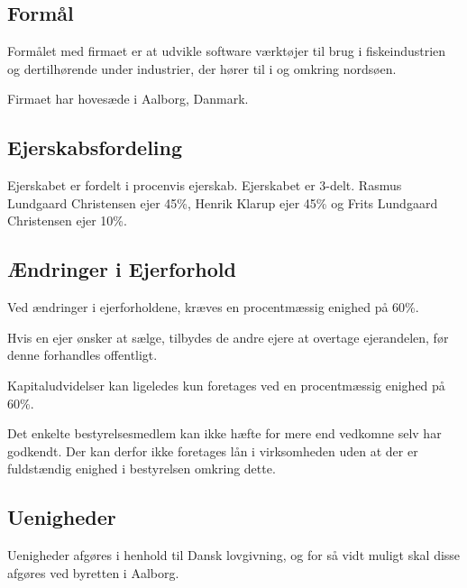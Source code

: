 \documentclass[a4paper,12pt,oneside,fleqn]{article}
\begin{document}
\subsection{Formål}
Formålet med firmaet er at udvikle software værktøjer til brug i fiskeindustrien og dertilhørende under industrier, der hører til i og omkring nordsøen.  

Firmaet har hovesæde i Aalborg, Danmark.

\subsection{Ejerskabsfordeling}
Ejerskabet er fordelt i procenvis ejerskab. Ejerskabet er 3-delt. Rasmus Lundgaard Christensen ejer 45\%, Henrik Klarup ejer 45\% og Frits Lundgaard Christensen ejer 10\%.

\subsection{Ændringer i Ejerforhold}
Ved ændringer i ejerforholdene, kræves en procentmæssig enighed på 60\%. 

Hvis en ejer ønsker at sælge, tilbydes de andre ejere at overtage ejerandelen, før denne forhandles offentligt. 

Kapitaludvidelser kan ligeledes kun foretages ved en procentmæssig enighed på 60\%. 

Det enkelte bestyrelsesmedlem kan ikke hæfte for mere end vedkomne selv har godkendt. Der kan derfor ikke foretages lån i virksomheden uden at der er fuldstændig enighed i bestyrelsen omkring dette. 

\subsection{Uenigheder}
Uenigheder afgøres i henhold til Dansk lovgivning, og for så vidt muligt skal disse afgøres ved byretten i Aalborg.  
\end{document}
